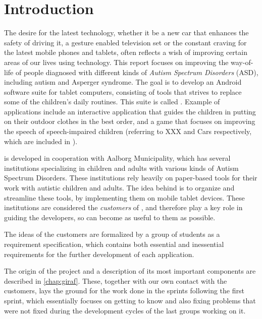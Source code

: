 \newcommand{\headerIntroduction}{Introduction}
\chapter*{\headerIntroduction}\label{chap:introduction}
\addcontentsline{toc}{chapter}{\headerIntroduction}

The desire for the latest technology, whether it be a new car that enhances the safety of driving it, a gesture enabled television set or the constant craving for the latest mobile phones and tablets, often reflects a wish of improving certain areas of our lives using technology.
This report focuses on improving the way-of-life of people diagnosed with different kinds of \textit{Autism Spectrum Disorders} (ASD), including autism and Asperger syndrome.
The goal is to develop an Android software suite for tablet computers, consisting of tools that strives to replace some of the children's daily routines. This suite is called \giraf.
Example of \giraf applications include an interactive application that guides the children in putting on their outdoor clothes in the best order, and a game that focuses on improving the speech of speech-impaired children (referring to XXX and Cars respectively, which are included in \giraf).

\giraf is developed in cooperation with Aalborg Municipality, which has several institutions specializing in children and adults with various kinds of Autism Spectrum Disorders.
These institutions rely heavily on paper-based tools for their work with autistic children and adults. 
The idea behind \giraf is to organize and streamline these tools, by implementing them on mobile tablet devices.
These institutions are considered the \textit{customers} of \giraf, and therefore play a key role in guiding the developers, so \giraf can become as useful to them as possible.

The ideas of the customers are formalized by a group of students as a requirement specification, which contains both essential and inessential requirements for the further development of each application.

The origin of the \giraf project and a description of its most important components are described in \cref{chap:giraf}.
These, together with our own contact with the customers, lays the ground for the work done in the sprints following the first sprint, which essentially focuses on getting to know \giraf and also fixing problems that were not fixed during the development cycles of the last groups working on it.